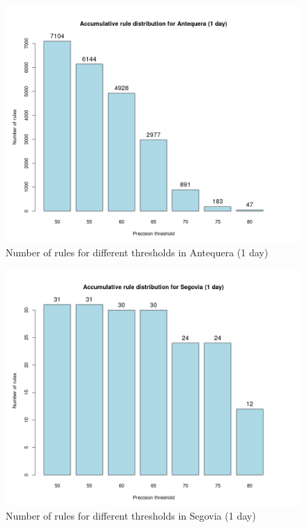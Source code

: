 \begin{figure}[hbtp]
\includegraphics[width=\textwidth]{img/precision_ant1.png}
\caption{Number of rules for different thresholds in Antequera (1 day)} \label{fig:precision_ant1}
\end{figure}

\begin{figure}[hbtp]
\includegraphics[width=\textwidth]{img/precision_seg1.png}
\caption{Number of rules for different thresholds in Segovia (1 day)} \label{fig:precision_seg1}
\end{figure}

